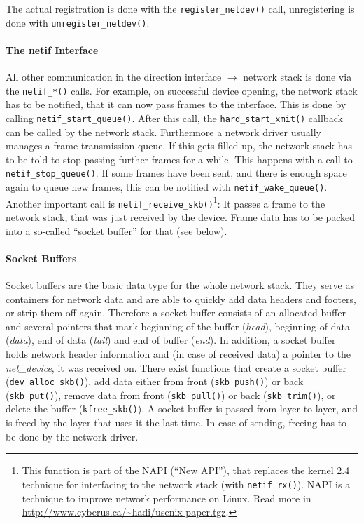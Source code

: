 \documentclass[a4paper,12pt,BCOR6mm,bibtotoc,idxtotoc]{scrbook}
\begin{document}
The actual registration is done with the \lstinline+register_netdev()+ call,
unregistering is done with \lstinline+unregister_netdev()+.

\paragraph{The netif Interface}

All other communication in the direction interface $\to$ network stack is done
via the \lstinline+netif_*()+ calls. For example, on successful device
opening, the network stack has to be notified, that it can now pass frames to
the interface.  This is done by calling \lstinline+netif_start_queue()+. After
this call, the \lstinline+hard_start_xmit()+ callback can be called by the
network stack.  Furthermore a network driver usually manages a frame
transmission queue. If this gets filled up, the network stack has to be told
to stop passing further frames for a while. This happens with a call to
\lstinline+netif_stop_queue()+.  If some frames have been sent, and there is
enough space again to queue new frames, this can be notified with
\lstinline+netif_wake_queue()+. Another important call is
\lstinline+netif_receive_skb()+\footnote{This function is part of the NAPI
(``New API''), that replaces the kernel 2.4 technique for interfacing to the
network stack (with \lstinline+netif_rx()+). NAPI is a technique to improve
network performance on Linux. Read more in
\url{http://www.cyberus.ca/~hadi/usenix-paper.tgz}.}: It passes a frame to the
network stack, that was just received by the device. Frame data has to be
packed into a so-called ``socket buffer'' for that (see below).

\paragraph{Socket Buffers}

Socket buffers are the basic data type for the whole network stack.  They
serve as containers for network data and are able to quickly add data headers
and footers, or strip them off again. Therefore a socket buffer consists of an
allocated buffer and several pointers that mark beginning of the buffer
(\textit{head}), beginning of data (\textit{data}), end of data
(\textit{tail}) and end of buffer (\textit{end}). In addition, a socket buffer
holds network header information and (in case of received data) a pointer to
the \textit{net\_device}, it was received on. There exist functions that
create a socket buffer (\lstinline+dev_alloc_skb()+), add data either from
front (\lstinline+skb_push()+) or back (\lstinline+skb_put()+), remove data
from front (\lstinline+skb_pull()+) or back (\lstinline+skb_trim()+), or
delete the buffer (\lstinline+kfree_skb()+).  A socket buffer is passed from
layer to layer, and is freed by the layer that uses it the last time. In case
of sending, freeing has to be done by the network driver.
\end{document}
